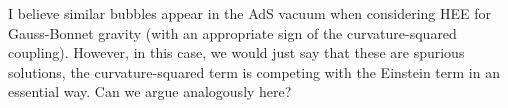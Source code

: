 I believe similar bubbles appear in the AdS vacuum when considering HEE for Gauss-Bonnet gravity (with an appropriate sign of the curvature-squared coupling). However, in this case, we would just say that these are spurious solutions, \eg the curvature-squared term is competing with the Einstein term in an essential way. Can we argue analogously here?

